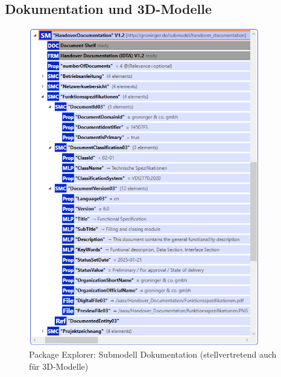 \subsection{Dokumentation und 3D-Modelle}
\begin{figure}[H]
    \centering
    \includegraphics[width=0.9\textwidth]{Bilder/ErgebnissePackageExplorer/SMCDokumentation.PNG}
    \caption{Package Explorer: Submodell Dokumentation (stellvertretend auch für 3D-Modelle)}
\end{figure}

\newpage
